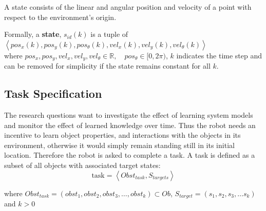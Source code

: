
A state consists of the linear and angular position and velocity of a point with respect to the environment's origin.\bs
{}

Formally, a \textbf{state}, $s_{id}(k)$ is a tuple of $\left\langle pos_x(k), pos_y(k), pos_\theta(k), vel_x(k), vel_y(k), vel_\theta(k)\right\rangle$\\ where $pos_x, pos_y, vel_x, vel_y, vel_\theta \in \mathbb{R}, \quad  pos_\theta \in [0, 2\pi)$, \quad $k$ indicates the time step and can be removed for simplicity if the state remains constant for all $k$.\\

\subsection{Task Specification}%
\label{subsec:task}
The research questions want to investigate the effect of learning system models and monitor the effect of learned knowledge over time. Thus the robot needs an incentive to learn object properties, and interactions with the objects in its environment, otherwise it would simply remain standing still in its initial location. Therefore the robot is asked to complete a task. A task is defined as a subset of all objects with associated target states:\bs
\[\text{task} = \left\langle Obst_{task}, S_{targets} \right\rangle\]

where $Obst_{task} = (obst_1, obst_2, obst_3, \dots, obst_k) \subset Ob$, $S_{target} = (s_1, s_2, s_3, \dots s_k)$ and $k>0$\bs

